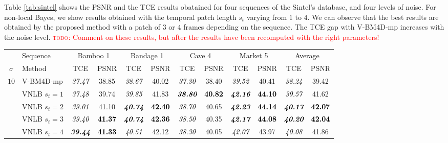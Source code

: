 \documentclass[10pt, journal, twocolumn, final, a4paper]{IEEEtran}
\newcommand{\bsic}[1]{\textcolor{black}{\textit{#1}}}
\newcommand{\Bsic}[1]{\textcolor{black}{\textbf{\textit{#1}}}}
\newcommand{\Best}[1]{\textbf{\textcolor{black}{#1}}}
\newcommand{\todo}[1]{\textcolor{red}{\noindent\textsc{todo}: #1}}
\begin{document}
Table \ref{tab:sintel} shows the PSNR and the TCE results obatained for four sequences of the
Sintel's database, and four levels of noise. For non-local Bayes, we show results obtained with 
the temporal patch length $s_t$ varying from $1$ to $4$. We can observe that the best results
are obtained by the proposed method with a patch of $3$ or $4$ frames depending
on the sequence. The TCE gap with V-BM4D-mp increases with the noise level. 
\todo{Comment on these results, but after the results have been recomputed with the right parameters!}

\begin{table}[htp!]
	\begin{center}
		{%
		\renewcommand{\tabcolsep}{1.6mm}
		\renewcommand{\arraystretch}{1.3}
		\begin{tabular}{ c | l |c c | c c | c c | c c | c c}
			\hline
			\rule{0pt}{10pt}         & Sequence          &\multicolumn{2}{c|}{Bamboo 1}&\multicolumn{2}{c|}{Bandage 1}&\multicolumn{2}{c|}{Cave 4} &\multicolumn{2}{c|}{Market 5}& \multicolumn{2}{c}{Average} \\
			\rule{0pt}{10pt}$\sigma$ & Method            & TCE          & PSNR         & TCE          & PSNR         & TCE          & PSNR         & TCE          & PSNR         & TCE          & PSNR         \\\hline
			\multirow{1}{*}{$10$}
			                      & V-BM4D-mp            & \bsic{37.47} &       38.85  & \bsic{38.67} &       40.02  & \bsic{37.30} &       38.40  & \bsic{39.52} &       40.41  & \bsic{38.24} &       39.42  \\
			                      & VNLB   $s_t = 1$     & \bsic{37.48} &       39.74  & \bsic{39.85} &       41.83  & \Bsic{38.80} & \Best{40.82} & \Bsic{42.16} & \Best{44.10} & \bsic{39.57} &       41.62  \\
			                      & VNLB   $s_t = 2$     & \bsic{39.01} &       41.10  & \Bsic{40.74} & \Best{42.40} & \bsic{38.70} &       40.65  & \Bsic{42.23} & \Best{44.14} & \Bsic{40.17} & \Best{42.07} \\
			                      & VNLB   $s_t = 3$     & \bsic{39.40} & \Best{41.37} & \Bsic{40.74} & \Best{42.36} & \bsic{38.50} &       40.35  & \Bsic{42.17} & \Best{44.08} & \Bsic{40.20} & \Best{42.04} \\
			                      & VNLB   $s_t = 4$     & \Bsic{39.44} & \Best{41.33} & \bsic{40.51} &       42.12  & \bsic{38.30} &       40.05  & \bsic{42.07} &       43.97  & \bsic{40.08} &       41.86  \\\hline

\end{tabular}}
\end{center}
\end{table}
\end{document}
